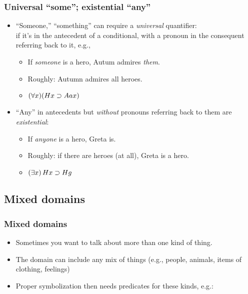 \begin{frame}
\frametitle{Universal ``some''; existential ``any''}

\begin{itemize}[<+->]
  \item ``Someone,'' ``something'' can require a \emph{universal} quantifier:\\
 if it's in the antecedent of a conditional, with a pronoun in the consequent referring back to it, e.g.,
  \begin{itemize}[<+->]
    \item[] If \emph{someone} is a hero, Autum admires \emph{them}.
    \item[] Roughly: Autumn admires all heroes.
    \item[] \alert{$(\forall x)(Hx \supset Aax)$}
  \end{itemize}
  \item ``Any'' in antecedents but \emph{without} pronouns referring back to
  them are \emph{existential}:
  \begin{itemize}[<+->]
    \item[] If \emph{anyone} is a hero, Greta is.
    \item[] Roughly: if there are heroes (at all), Greta is a hero.
    \item[] \alert{$(\exists x)\, Hx \supset Hg$}
  \end{itemize}
\end{itemize}
\end{frame}

\subsection{Mixed domains}

\begin{frame}
\frametitle{Mixed domains}

\begin{itemize}[<+->]
  \item Sometimes you want to talk about more than one kind of thing.
  \item The domain can include any mix of things (e.g., people,
  animals, items of clothing, feelings)
  \item Proper symbolization then needs predicates for these kinds, e.g.:
\end{itemize}
\end{frame}



